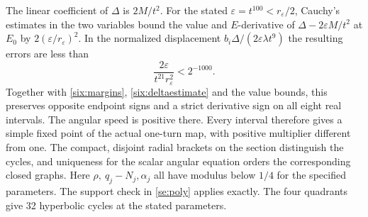 The linear coefficient of \(\Delta\) is \(2M/t^2\). For the stated
\(\varepsilon=t^{100}<r_\varepsilon/2\), Cauchy's estimates in the two
variables bound the value and \(E\)-derivative of
\(\Delta-2\varepsilon M/t^2\) at \(E_0\) by
\(2(\varepsilon/r_\varepsilon)^2\). In the normalized displacement
\(b_i\Delta/(2\varepsilon\lambda t^9)\) the resulting errors are less than
\[
            \frac{2\varepsilon}{t^{21}r_\varepsilon^2}<2^{-1000}.
\]
Together with \eqref{six:margins}, \eqref{six:deltaestimate} and the value
bounds, this preserves opposite endpoint signs and a strict derivative
sign on all eight real intervals. The angular speed is positive there.
Every interval therefore gives a simple fixed point of the actual
one-turn map, with positive multiplier different from one.
The compact, disjoint radial brackets on the section distinguish
the cycles, and uniqueness for the scalar angular equation orders
the corresponding closed graphs. Here \(\rho,\ q_j-N_j,\alpha_j\)
all have modulus below \(1/4\) for the specified parameters.
The support check in \eqref{se:poly} applies exactly. The four quadrants
give 32 hyperbolic cycles at the stated parameters.
